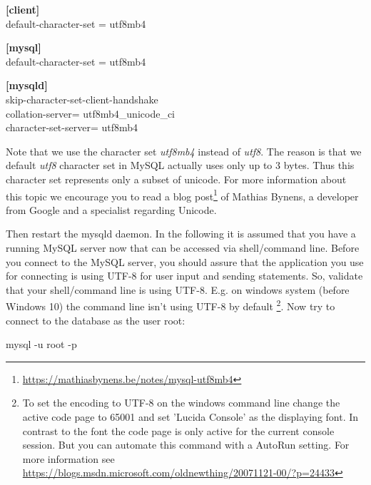 \begin{codebox}
\textbf{[client]}\\
\noindent\hspace*{4mm}  default-character-set = utf8mb4

\textbf{[mysql]}\\
\noindent\hspace*{4mm}  default-character-set = utf8mb4

\textbf{[mysqld]}\\
\noindent\hspace*{4mm}  skip-character-set-client-handshake\\
\noindent\hspace*{4mm}  collation-server= utf8mb4\_unicode\_ci\\
\noindent\hspace*{4mm}  character-set-server= utf8mb4\\
\end{codebox}

Note that we use the character set \emph{utf8mb4} instead of \emph{utf8}. The reason is that we default \emph{utf8} character set in MySQL actually uses only up to 3 bytes. Thus this character set represents only a subset of unicode. For more information about this topic we encourage you to read a blog post\footnote{\url{https://mathiasbynens.be/notes/mysql-utf8mb4}} of Mathias Bynens, a developer from Google and a specialist regarding Unicode.

Then restart the mysqld daemon. In the following it is assumed that you have a running MySQL server now that can be accessed via shell/command line. Before you connect to the MySQL server, you should assure that the application you use for connecting is using UTF-8 for user input and sending statements. So, validate that your shell/command line is using UTF-8. E.g. on windows system (before Windows 10) the command line isn't using UTF-8 by default
\footnote{To set the encoding to UTF-8 on the windows command line change the active code page to 65001 and set 'Lucida Console' as the displaying font. In contrast to the font the code page is only active for the current console session. But you can automate this command with a AutoRun setting. For more information see \url{https://blogs.msdn.microsoft.com/oldnewthing/20071121-00/?p=24433}}.  
Now try to connect to the database as the user root:

\begin{codebox}
	mysql -u root -p 
\end{codebox}

